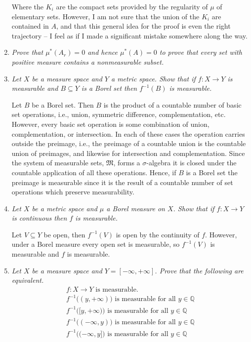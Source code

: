 \documentclass[11pt]{article}
\newcommand{\Q}{\mathbb{Q}}
\begin{document}
\begin{enumerate}
Where the $K_i$ are the compact sets provided by the regularity of $\mu$ of elementary sets.  However, I am not sure that the union of the $K_i$ are contained in $A$, and that this general idea for the proof is even the right trajectory -- I feel as if I made a significant mistake somewhere along the way.

\item \emph{Prove that $\mu^\ast(A_r) = 0$ and hence $\mu^\ast(A) = 0$ to prove that every set with positive measure contains a nonmeasurable subset.}

\item \emph{Let $X$ be a measure space and $Y$ a metric space.  Show that if $f: X \rightarrow Y$ is measurable and $B \subseteq Y$ is a Borel set then $f^{-1}(B)$ is measurable.}

Let $B$ be a Borel set.  Then $B$ is the product of a countable number of basic set operations, i.e., union, symmetric difference, complementation, etc.  However, every basic set operation is some combination of union, complementation, or intersection.  In each of these cases the operation carries outside the preimage, i.e., the preimage of a countable union is the countable union of preimages, and likewise for intersection and complementation.  Since the system of measurable sets, $\mathfrak{M}$, forms a $\sigma$-algebra it is closed under the countable application of all these operations.  Hence, if $B$ is a Borel set the preimage is measurable since it is the result of a countable number of set operations which preserve measurability.

\item \emph{Let $X$ be a metric space and $\mu$ a Borel measure on $X$.  Show that if $f: X \rightarrow Y$ is continuous then $f$ is measurable.}

Let $V \subseteq Y$ be open, then $f^{-1}(V)$ is open by the continuity of $f$.  However, under a Borel measure every open set is measurable, so $f^{-1}(V)$ is measurable and $f$ is measurable.

\newpage
\item \emph{Let $X$ be a measure space and $Y = [-\infty, +\infty]$. Prove that the following are equivalent.}
\begin{eqnarray}
f:X \rightarrow Y\mbox{ is measurable.} \label{measurable}\\
f^{-1}\big((y,+\infty)\big) \mbox{ is measurable for all } y \in \Q \label{meas_gt} \\
f^{-1}\big([y,+\infty)\big) \mbox{ is measurable for all } y \in \Q \label{meas_geq}\\
f^{-1}\big((-\infty,y)\big) \mbox{ is measurable for all } y \in \Q \label{meas_lt}\\
f^{-1}\big((-\infty,y]\big) \mbox{ is measurable for all } y \in \Q \label{meas_leq}
\end{eqnarray}



\end{enumerate}
\end{document}
